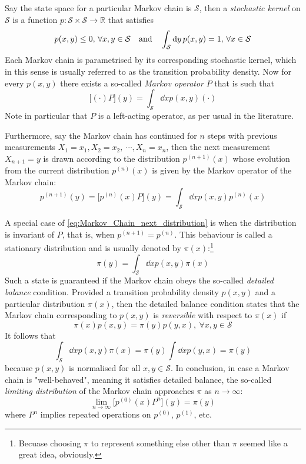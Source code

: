 \documentclass[nofootinbib,reprint,english]{revtex4-1}
\newcommand{\Sspace}{\mathcal{S}}
\begin{document}
Say the state space for a particular Markov chain is \(\mathcal{S}\), then a \emph{stochastic kernel} on \(\Sspace\) is a function \(p:\Sspace\times\Sspace\to\mathbb{R}\) that satisfies
\[p(x,y)\leq0,\,\forall x,y\in\Sspace\qand\int_\Sspace\dd{y}p(x,y)=1,\,\forall x\in\Sspace\]
Each Markov chain is parametrised by its corresponding stochastic kernel, which in this sense is usually referred to as the transition probability density. Now for every \(p(x,y)\) there exists a so-called \emph{Markov operator} \(P\) that is such that
\[\big[(\cdot)P\big](y)=\int_\Sspace\dd{x}p(x,y)(\cdot)\]
Note in particular that \(P\) is a left-acting operator, as per usual in the literature.

Furthermore, say the Markov chain has continued for \(n\) steps with previous measurements \(X_1=x_1,X_2=x_2,\ \cdots,X_n=x_n\), then the next measurement \(X_{n+1}=y\) is drawn according to the distribution \(p^{(n+1)}(x)\) whose evolution from the current distribution \(p^{(n)}(x)\) is given by the Markov operator of the Markov chain:
\begin{equation}\label{eq:Markov_Chain_next_distribution}
p^{(n+1)}(y)=\big[p^{(n)}(x)P\big](y)=\int_\Sspace\dd{x}p(x,y)p^{(n)}(x)
\end{equation}

A special case of \eqref{eq:Markov_Chain_next_distribution} is when the distribution is invariant of \(P\), that is, when \(p^{(n+1)}=p^{(n)}\). This behaviour is called a stationary distribution and is usually denoted by \(\pi(x)\):\footnote{Becuase choosing \(\pi\) to represent something else other than \(\pi\) seemed like a great idea, obviously.}
\begin{equation}
\pi(y)=\int_\Sspace\dd{x}p(x,y)\pi(x)
\end{equation}
Such a state is guaranteed if the Markov chain obeys the so-called \emph{detailed balance} condition. Provided a transition probability density \(p(x,y)\) and a particular distribution \(\pi(x)\), then the detailed balance condition states that the Markov chain corresponding to \(p(x,y)\) is \emph{reversible} with respect to \(\pi(x)\) if
\begin{equation}\label{eq:Markov_Chain_detailed_balance}
\pi(x)p(x,y)=\pi(y)p(y,x),\ \forall x,y\in\Sspace
\end{equation}
It follows that
\[\int_\Sspace\dd{x}p(x,y)\pi(x)=\pi(y)\int\dd{x}p(y,x)=\pi(y)\]
because \(p(x,y)\) is normalised for all \(x,y\in\Sspace\). In conclusion, in case a Markov chain is "well-behaved", meaning it satisfies detailed balance, the so-called \emph{limiting distribution} of the Markov chain approaches \(\pi\) as \(n\to\infty\):
\begin{equation}
\lim_{n\to\infty}\big[p^{(0)}(x)P^n\big](y)=\pi(y)
\end{equation}
where \(P^n\) implies repeated operations on \(p^{(0)}\), \(p^{(1)}\), etc.
\end{document}
